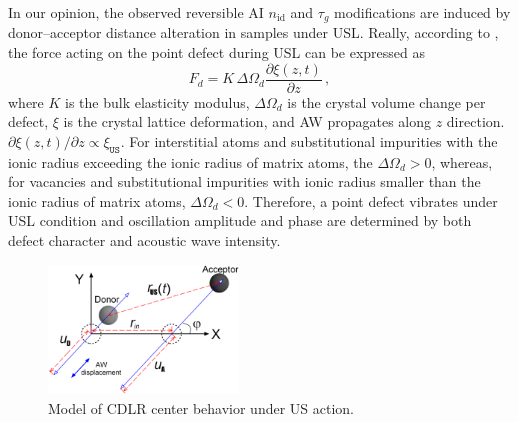 \documentclass[aip,jap, amsmath,amssymb,reprint]{revtex4-1}
\begin{document}
In our opinion, the observed reversible AI $n_{\mathrm{id}}$ and $\tau_g$ modifications are induced by
donor--acceptor distance alteration in samples under USL.
Really, according to \cite{MirzadeJAP2011,PeleshchakUJF2016}, the force acting on the point defect during USL can be expressed as
\begin{equation}
\label{eqFd}
F_d=K\,\Delta\Omega_d\frac{\partial \xi(z,t)}{\partial z}\,,
\end{equation}
where
$K$ is the bulk elasticity modulus,
$\Delta\Omega_d$ is the crystal volume change per defect,
$\xi$ is the crystal lattice deformation,
and AW propagates along $z$ direction.
$\partial \xi(z,t)/\partial z\propto \xi_{\mathtt{US}}$.
For interstitial atoms and substitutional impurities with the ionic radius exceeding the ionic radius of matrix
atoms, the $\Delta\Omega_d > 0$, whereas,
for vacancies and substitutional impurities with ionic radius smaller than the ionic radius of matrix atoms,
$\Delta\Omega_d < 0$.
Therefore, a point defect vibrates under USL condition and oscillation amplitude and phase are determined by both defect character and acoustic wave intensity.

\begin{figure}
\includegraphics[width=0.45\textwidth]{olikhFig4}%
\caption{\label{fig_Model}
Model of CDLR center behavior under US action.
}%
\end{figure}
\end{document}

